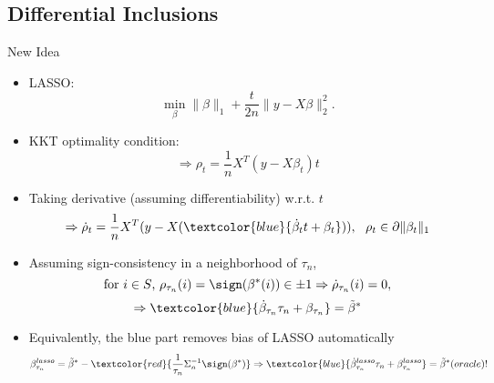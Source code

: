 \documentclass[slidestop,compress,9pt,epsfig,color]{beamer}
\theoremstyle{example}
\begin{document}
\subsection{Differential Inclusions}

\begin{frame}{New Idea}
\begin{itemize}
\item LASSO: 
$$
\min_\beta \|\beta\|_1+\frac{t}{2n}\| y - X\beta \|_2^2.
$$
\item \pause KKT optimality condition:
\[ \Rightarrow {\rho_t}=\frac{1}{n} X^T(y-X{\beta}_t)t \]
\item \pause Taking derivative (assuming differentiability) w.r.t. $t$
\[ \Rightarrow \dot \rho_t = \frac{1}{n} X^T ( y - X (\textcolor{blue}{\dot \beta_t t + \beta_t})) , \ \ \rho_t \in \partial \|\beta_t\|_1\]
\item \pause Assuming sign-consistency in a neighborhood of $\tau_n$, 
\[ \mbox{for $i\in S$,   } \rho_{\tau_n}(i)=\sign(\beta^*(i))\in \pm 1 \Rightarrow \dot \rho_{\tau_n}(i)=0, \]
\[ \Rightarrow  \textcolor{blue}{\dot \beta_{\tau_n} \tau_n + \beta_{\tau_n} }= \tilde{\beta}^* \]
\item \pause Equivalently, the blue part removes bias of LASSO automatically
$$\beta^{lasso}_{\tau_n} = \tilde{\beta}^\ast -  \textcolor{red}{\frac{1}{\tau_n} \Sigma_n^{-1} \sign(\beta^*) }\Rightarrow \textcolor{blue}{\dot \beta^{lasso}_{\tau_n} \tau_n + \beta^{lasso}_{\tau_n}} = \tilde{\beta}^\ast (oracle)!$$
\end{itemize}
\end{frame}
\end{document}
